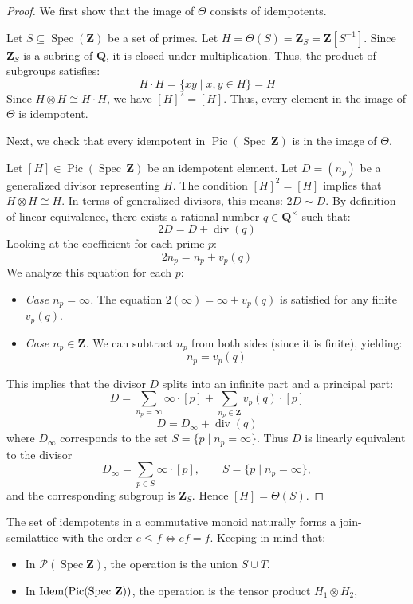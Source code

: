 \documentclass[11pt,a4paper]{article}
\newcommand{\Q}{\mathbf{Q}}
\newcommand{\Z}{\mathbf{Z}}
\newcommand{\Spec}{\operatorname{Spec}}
\def\Pic{\operatorname{Pic}}
\def\Idem{\rm{Idem}}
\theoremstyle{plain}
\newtheorem{rem}[thm]{Remark}
\theoremstyle{definition} %
\begin{document}
\begin{proof}
We first show that  the image of $\Theta$ consists of idempotents. 

Let $S \subseteq \Spec(\Z)$ be a set of primes. Let $H = \Theta(S) = \Z_S = \Z[S^{-1}]$.
Since $\Z_S$ is a subring of $\Q$, it is closed under multiplication. Thus, the product of subgroups satisfies:
\[
H \cdot H = \{ xy \mid x, y \in H \} = H
\]
Since $H \otimes H \cong H \cdot H$, we have $[H]^2 = [H]$. Thus, every element in the image of $\Theta$ is idempotent.

Next, we check that every idempotent in $\Pic(\Spec\,\Z)$ is in the image of $\Theta$.

Let $[H] \in \Pic(\Spec\,\Z)$ be an idempotent element. Let $D=(n_p)$ be a generalized divisor representing $H$.
The condition $[H]^2 = [H]$ implies that $H \otimes H \cong H$. In terms of generalized divisors, this means:
$
2D \sim D
$.
By definition of linear equivalence, there exists a rational number $q \in \Q^\times$ such that:
\[
2D = D + \operatorname{div}(q)
\]
Looking at the coefficient for each prime $p$:
\[
2n_p = n_p + v_p(q)
\]
We analyze this equation for each $p$:
\begin{itemize}[leftmargin=*, labelindent=0pt]
    \item[] \emph{Case $n_p = \infty$.} The equation $2(\infty) = \infty + v_p(q)$ is satisfied for any finite $v_p(q)$.
    \item[] \emph{Case $n_p \in \Z$.} We can subtract $n_p$ from both sides (since it is finite), yielding:
    \[
    n_p = v_p(q)
    \]
\end{itemize}
This implies that the divisor $D$ splits into an infinite part and a principal part:
\[
D = \sum_{n_p = \infty} \infty \cdot [p] + \sum_{n_p \in \Z} v_p(q) \cdot [p]
\]
\[
D = D_\infty + \operatorname{div}(q)
\]
where $D_\infty$ corresponds to the set $S = \{ p \mid n_p = \infty \}$.
Thus $D$ is linearly equivalent to the divisor
\[
D_\infty=\sum_{p\in S}\infty\cdot[p],
\qquad
S=\{p\mid n_p=\infty\},
\]
and the corresponding subgroup is $\Z_S$.
Hence $[H]=\Theta(S)$.
\end{proof}

The set of idempotents in a commutative monoid naturally forms a join-semilattice with the order $e \le f \iff ef = f$. Keeping in mind that:
\begin{itemize}[leftmargin=*, labelindent=0pt]
    \item[] In $\mathcal{P}(\Spec \Z)$, the operation is the union $S \cup T$.
    \item[] In  $\Idem(\Pic(\Spec\,\Z))$, the operation is the tensor product $H_1 \otimes H_2$,
\end{itemize}
\end{document}
